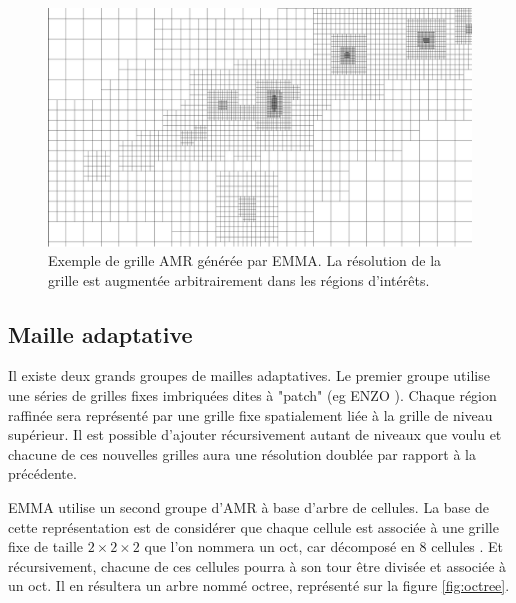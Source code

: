 \begin{figure}
        \includegraphics[width=.95\linewidth]{img/02/AMR.pdf} 
        \caption[Grille générée par EMMA]{Exemple de grille \ac{AMR} générée par EMMA. 
        La  résolution de la grille est augmentée arbitrairement dans les régions d'intérêts.
 		\label{fig:AMR}}
\end{figure}

\subsection{Maille adaptative}

Il existe deux grands groupes de mailles adaptatives.
Le premier groupe utilise une séries de grilles fixes imbriquées dites à "patch" (eg ENZO \cite{bryan_enzo:_2014}).
Chaque région raffinée sera représenté par une grille fixe spatialement liée à la grille de niveau supérieur.
Il est possible d'ajouter récursivement autant de niveaux que voulu et chacune de ces nouvelles grilles aura une résolution doublée par rapport à la précédente.

EMMA utilise un second groupe d'\ac{AMR} à base d'arbre de cellules. %
La base de cette représentation est de considérer que chaque cellule est associée à une grille fixe de taille $2 \times 2 \times 2$ que l'on nommera un oct, car décomposé en 8 cellules \citep{khokhlov_fully_1998-1}.
Et récursivement, chacune de ces cellules pourra à son tour être divisée et associée à un oct.
Il en résultera un arbre nommé octree, représenté sur la figure \ref{fig:octree}.

